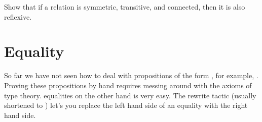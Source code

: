 \documentclass[letterpaper,10pt,english]{sphinxmanual}
\begin{document}
\sphinxAtStartPar
Show that if a relation is symmetric, transitive, and connected,
then it is also reflexive.

\def\sphinxLiteralBlockLabel{\label{\detokenize{day2:relationship-paradox}}}
\begin{sphinxVerbatim}[commandchars=\\\{\}]
 

   

 
        
               
                    
          
        
\end{sphinxVerbatim}


\section{Equality}
\label{\detokenize{day2:equality}}
\sphinxAtStartPar
So far we have not seen how to deal with propositions of the form , for example, . Proving these propositions by hand requires messing around with the axioms of type theory.
 equalities on the other hand is very easy. The rewrite tactic (usually shortened to ) let’s you replace the left hand side of an equality with the right hand side.
\end{document}
